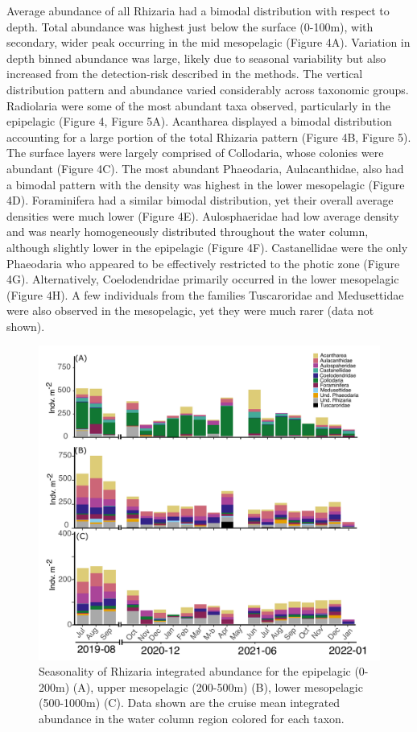 \documentclass[
]{article}
\begin{document}
Average abundance of all Rhizaria had a bimodal distribution with
respect to depth. Total abundance was highest just below the surface
(0-100m), with secondary, wider peak occurring in the mid mesopelagic
(Figure 4A). Variation in depth binned abundance was large, likely due
to seasonal variability but also increased from the detection-risk
described in the methods. The vertical distribution pattern and
abundance varied considerably across taxonomic groups. Radiolaria were
some of the most abundant taxa observed, particularly in the epipelagic
(Figure 4, Figure 5A). Acantharea displayed a bimodal distribution
accounting for a large portion of the total Rhizaria pattern (Figure 4B,
Figure 5). The surface layers were largely comprised of Collodaria,
whose colonies were abundant (Figure 4C). The most abundant Phaeodaria,
Aulacanthidae, also had a bimodal pattern with the density was highest
in the lower mesopelagic (Figure 4D). Foraminifera had a similar bimodal
distribution, yet their overall average densities were much lower
(Figure 4E). Aulosphaeridae had low average density and was nearly
homogeneously distributed throughout the water column, although slightly
lower in the epipelagic (Figure 4F). Castanellidae were the only
Phaeodaria who appeared to be effectively restricted to the photic zone
(Figure 4G). Alternatively, Coelodendridae primarily occurred in the
lower mesopelagic (Figure 4H). A few individuals from the families
Tuscaroridae and Medusettidae were also observed in the mesopelagic, yet
they were much rarer (data not shown).

\begin{figure}

{\centering \includegraphics{images/05_seasonality.pdf}

}

\caption{Seasonality of Rhizaria integrated abundance for the epipelagic
(0-200m) (A), upper mesopelagic (200-500m) (B), lower mesopelagic
(500-1000m) (C). Data shown are the cruise mean integrated abundance in
the water column region colored for each taxon.}

\end{figure}
\end{document}
